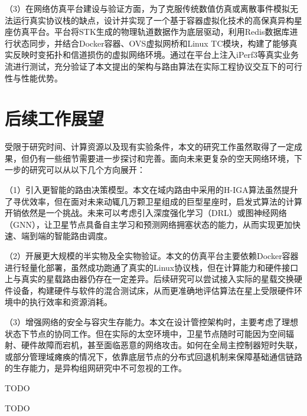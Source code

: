 \documentclass[print, master, vlined]{DissertUESTC}
\begin{document}
    （3）在网络仿真平台建设与验证方面，为了克服传统数值仿真或离散事件模拟无法运行真实协议栈的缺点，设计并实现了一个基于容器虚拟化技术的高保真异构星座仿真平台。平台将STK生成的物理轨道数据作为底层驱动，利用Redis数据库进行状态同步，并结合Docker容器、OVS虚拟网桥和Linux TC模块，构建了能够真实反映时变拓扑和信道损伤的虚拟网络环境。通过在平台上注入iPerf3等真实业务流进行测试，充分验证了本文提出的架构与路由算法在实际工程协议交互下的可行性与性能优势。

    \section{后续工作展望}
    受限于研究时间、计算资源以及现有实验条件，本文的研究工作虽然取得了一定成果，但仍有一些细节需要进一步探讨和完善。面向未来更复杂的空天网络环境，下一步的研究可以从以下几个方向展开：

    （1）引入更智能的路由决策模型。本文在域内路由中采用的H-IGA算法虽然提升了寻优效率，但在面对未来动辄几万颗卫星组成的巨型星座时，启发式算法的计算开销依然是一个挑战。未来可以考虑引入深度强化学习（DRL）或图神经网络（GNN），让卫星节点具备自主学习和预测网络拥塞状态的能力，从而实现更加快速、端到端的智能路由调度。

    （2）开展更大规模的半实物及全实物验证。本文的仿真平台主要依赖Docker容器进行轻量化部署，虽然成功跑通了真实的Linux协议栈，但在计算能力和硬件接口上与真实的星载路由器仍存在一定差异。后续研究可以尝试接入实际的星载交换硬件设备，构建硬件与软件的混合测试床，从而更准确地评估算法在星上受限硬件环境中的执行效率和资源消耗。

    （3）增强网络的安全与容灾生存能力。本文在设计管控架构时，主要考虑了理想状态下节点的协同工作。但在实际的太空环境中，卫星节点随时可能因为空间辐射、硬件故障而宕机，甚至面临恶意的网络攻击。如何在全局主控制器短时失联，或部分管理域瘫痪的情况下，依靠底层节点的分布式回退机制来保障基础通信链路的生存能力，是异构组网研究中不可忽视的工作。
    
	\acknowledgement
	TODO
	
	
	
	\appendix
	
	\achievement %
    TODO
	
	
\end{document}

